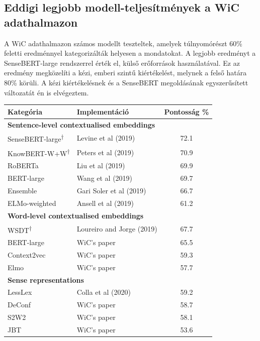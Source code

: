 \documentclass[12pt]{report}
\theoremstyle{definition}
\begin{document}
\subsection{Eddigi legjobb modell-teljesítmények a WiC adathalmazon}
A WiC adathalmazon számos modellt teszteltek, amelyek túlnyomórészt 60\% feletti eredménnyel kategorizálták helyesen a mondatokat.
A legjobb eredményt a SenseBERT-large rendszerrel érték el, külső erőforrások használatával. Ez az eredmény megközelíti a kézi, emberi szintű kiértékelést, melynek a felső határa 80\% körüli. A kézi kiértékelésnek és a SenseBERT megoldásának egyszerűsített változatát én is elvégeztem.


\begin{table}[h]
    \centering
    \begin{tabular}{l l c}
        \toprule
        \textbf{Kategória} & \textbf{Implementáció} & \textbf{Pontosság \%} \\
        \midrule
        \multicolumn{3}{l}{\textbf{Sentence-level contextualised embeddings}} \\
        SenseBERT-large\textsuperscript{†} & Levine et al (2019) & 72.1 \\
        KnowBERT-W+W\textsuperscript{†} & Peters et al (2019) & 70.9 \\
        RoBERTa & Liu et al (2019) & 69.9 \\
        BERT-large & Wang et al (2019) & 69.7 \\
        Ensemble & Gari Soler et al (2019) & 66.7 \\
        ELMo-weighted & Ansell et al (2019) & 61.2 \\
        \midrule
        \multicolumn{3}{l}{\textbf{Word-level contextualised embeddings}} \\
        WSDT\textsuperscript{†} & Loureiro and Jorge (2019) & 67.7 \\
        BERT-large & WiC's paper & 65.5 \\
        Context2vec & WiC's paper & 59.3 \\
        Elmo & WiC's paper & 57.7 \\
        \midrule
        \multicolumn{3}{l}{\textbf{Sense representations}} \\
        LessLex & Colla et al (2020) & 59.2 \\
        DeConf & WiC's paper & 58.7 \\
        S2W2 & WiC's paper & 58.1 \\
        JBT & WiC's paper & 53.6 \\

\end{tabular}
\end{table}
\end{document}
